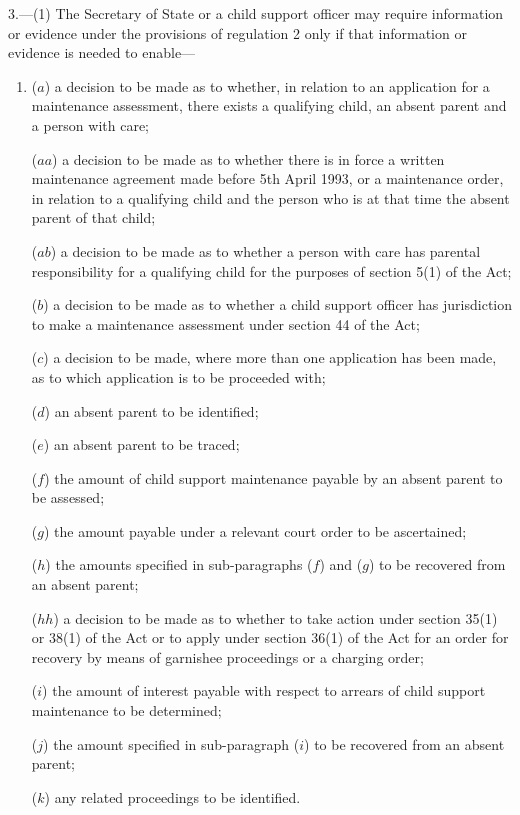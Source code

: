 \documentclass[a4paper,12pt]{article}
\begin{document}
3.—(1) The Secretary of State 
or a child support officer  %
may require information or evidence under the provisions of regulation 2 only if that information or evidence is needed to enable—
\begin{enumerate}\item[]
($a$) a decision to be made as to whether, in relation to an application for a maintenance assessment, there exists a qualifying child, an absent parent and a person with care;

($aa$) a decision to be made as to whether there is in force a written maintenance agreement made before 5th April 1993, or a maintenance order, in relation to a qualifying child and the person who is at that time the absent parent of that child;

($ab$) a decision to be made as to whether a person with care has parental responsibility for a qualifying child for the purposes of section 5(1) of the Act;

($b$) a decision to be made as to whether a child support officer has jurisdiction to make a maintenance assessment under section 44 of the Act;

($c$) a decision to be made, where more than one application has been made, as to which application is to be proceeded with;

($d$) an absent parent to be identified;

($e$) an absent parent to be traced;

($f$) the amount of child support maintenance payable by an absent parent to be assessed;

($g$) the amount payable under a relevant court order to be ascertained;

($h$) the amounts specified in sub-paragraphs ($f$) and ($g$) to be recovered from an absent parent;

($hh$) a decision to be made as to whether to take action under section 35(1) or 38(1) of the Act or to apply under section 36(1) of the Act for an order for recovery by means of garnishee proceedings or a charging order;

($i$) the amount of interest payable with respect to arrears of child support maintenance to be determined;

($j$) the amount specified in sub-paragraph ($i$) to be recovered from an absent parent;

($k$) any related proceedings to be identified.
\end{enumerate}
\end{document}
